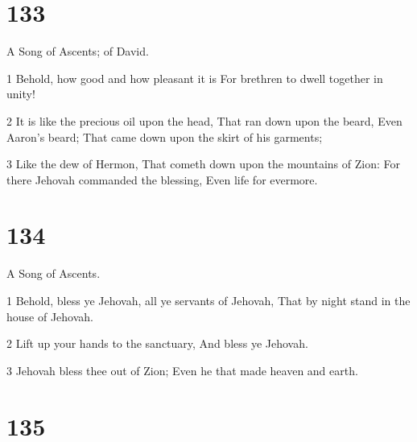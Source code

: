 \chapter{133}

\par A Song of Ascents; of David.

\par 1 Behold, how good and how pleasant it is For brethren to dwell together in unity!
\par 2 It is like the precious oil upon the head, That ran down upon the beard, Even Aaron's beard; That came down upon the skirt of his garments;
\par 3 Like the dew of Hermon, That cometh down upon the mountains of Zion: For there Jehovah commanded the blessing, Even life for evermore.

\chapter{134}

\par A Song of Ascents.

\par 1 Behold, bless ye Jehovah, all ye servants of Jehovah, That by night stand in the house of Jehovah.
\par 2 Lift up your hands to the sanctuary, And bless ye Jehovah.
\par 3 Jehovah bless thee out of Zion; Even he that made heaven and earth.

\chapter{135}

